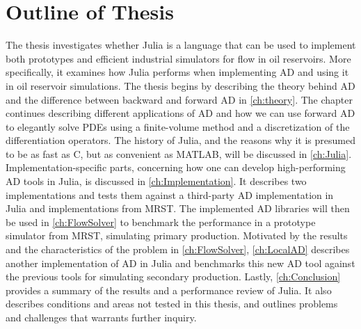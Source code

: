 \section{Outline of Thesis}
The thesis investigates whether Julia is a language that can be used to implement both prototypes and efficient industrial simulators for flow in oil reservoirs. More specifically, it examines how Julia performs when implementing AD and using it in oil reservoir simulations. The thesis begins by describing the theory behind AD and the difference between backward and forward AD in \autoref{ch:theory}. The chapter continues describing different applications of AD and how we can use forward AD to elegantly solve PDEs using a finite-volume method and a discretization of the differentiation operators. The history of Julia, and the reasons why it is presumed to be as fast as C, but as convenient as MATLAB, will be discussed in \autoref{ch:Julia}. Implementation-specific parts, concerning how one can develop high-performing AD tools in Julia, is discussed in \autoref{ch:Implementation}. It describes two implementations and tests them against a third-party AD implementation in Julia and implementations from MRST. The implemented AD libraries will then be used in \autoref{ch:FlowSolver} to benchmark the performance in a prototype simulator from MRST, simulating primary production. Motivated by the results and the characteristics of the problem in \autoref{ch:FlowSolver}, \autoref{ch:LocalAD} describes another implementation of AD in Julia and benchmarks this new AD tool against the previous tools for simulating secondary production. Lastly, \autoref{ch:Conclusion} provides a summary of the results and a performance review of Julia. It also describes conditions and areas not tested in this thesis, and outlines problems and challenges that warrants further inquiry.